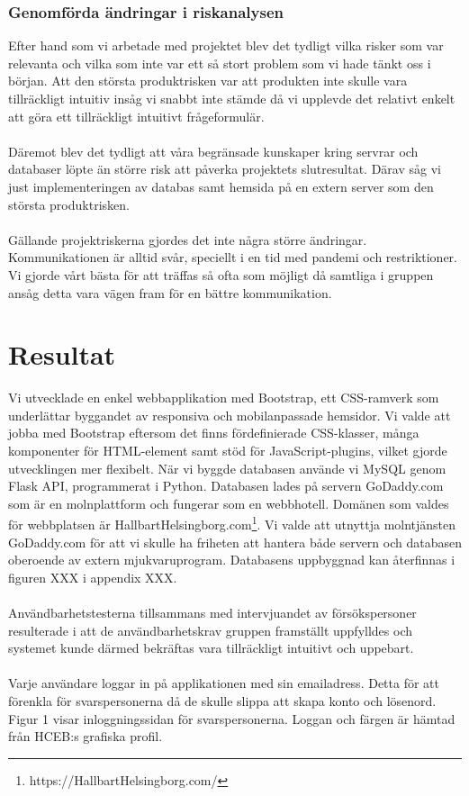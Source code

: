 \documentclass[12pt]{article}
\begin{document}
 \subsubsection{Genomförda ändringar i riskanalysen}Efter hand som vi arbetade med projektet blev det tydligt vilka risker som var relevanta och vilka som inte var ett så stort problem som vi hade tänkt oss i början. Att den största produktrisken var att produkten inte skulle vara tillräckligt intuitiv insåg vi snabbt inte stämde då vi upplevde det relativt enkelt att göra ett tillräckligt intuitivt frågeformulär.\\\\
 Däremot blev det tydligt att våra begränsade kunskaper kring servrar och databaser löpte än större risk att påverka projektets slutresultat. Därav såg vi just implementeringen av databas samt hemsida på en extern server som den största produktrisken.\\\\
 Gällande projektriskerna gjordes det inte några större ändringar. Kommunikationen är alltid svår, speciellt i en tid med pandemi och restriktioner. Vi gjorde vårt bästa för att träffas så ofta som möjligt då samtliga i gruppen ansåg detta vara vägen fram för en bättre kommunikation. 
 

 



\section{Resultat}
Vi utvecklade en enkel webbapplikation med Bootstrap, ett CSS-ramverk som underlättar byggandet av responsiva och mobilanpassade hemsidor. Vi valde att jobba med Bootstrap eftersom det finns fördefinierade CSS-klasser, många komponenter för HTML-element samt stöd för JavaScript-plugins, vilket gjorde utvecklingen mer flexibelt. När vi byggde databasen använde vi MySQL genom Flask API, programmerat i Python. Databasen lades på servern GoDaddy.com som är en molnplattform och fungerar som en webbhotell. Domänen som valdes för webbplatsen är HallbartHelsingborg.com\footnote{https://HallbartHelsingborg.com/}. Vi valde att utnyttja molntjänsten GoDaddy.com för att vi skulle ha friheten att hantera både servern och databasen oberoende av extern mjukvaruprogram. Databasens uppbyggnad kan återfinnas i figuren XXX i appendix XXX.\\\\
Användbarhetstesterna tillsammans med intervjuandet av försökspersoner resulterade i att de användbarhetskrav gruppen framställt uppfylldes och systemet kunde därmed bekräftas vara tillräckligt intuitivt och uppebart.\\\\
Varje användare loggar in på applikationen med sin emailadress. Detta för att förenkla för svarspersonerna då de skulle slippa att skapa konto och lösenord. Figur 1 visar inloggningssidan för svarspersonerna. Loggan och färgen är hämtad från HCEB:s grafiska profil. \\
\end{document}
